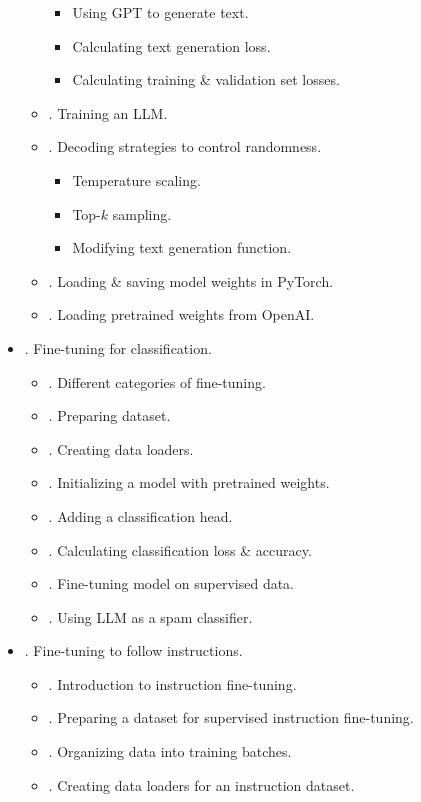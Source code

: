 \documentclass{article}
\begin{document}
\begin{itemize}
\begin{itemize}
		\begin{itemize}
			\item {\sf Using GPT to generate text.}
			\item {\sf Calculating text generation loss.}
			\item {\sf Calculating training \& validation set losses.}
		\end{itemize}
		\item {. Training an LLM.}
		\item {. Decoding strategies to control randomness.}
		\begin{itemize}
			\item {\sf Temperature scaling.}
			\item {\sf Top-$k$ sampling.}
			\item {\sf Modifying text generation function.}
		\end{itemize}
		\item {. Loading \& saving model weights in PyTorch.}
		\item {. Loading pretrained weights from OpenAI.}
	\end{itemize}
	\item {. Fine-tuning for classification.}
	\begin{itemize}
		\item {. Different categories of fine-tuning.}
		\item {. Preparing dataset.}
		\item {. Creating data loaders.}
		\item {. Initializing a model with pretrained weights.}
		\item {. Adding a classification head.}
		\item {. Calculating classification loss \& accuracy.}
		\item {. Fine-tuning model on supervised data.}
		\item {. Using LLM as a spam classifier.}
	\end{itemize}
	\item {. Fine-tuning to follow instructions.}
	\begin{itemize}
		\item {. Introduction to instruction fine-tuning.}
		\item {. Preparing a dataset for supervised instruction fine-tuning.}
		\item {. Organizing data into training batches.}
		\item {. Creating data loaders for an instruction dataset.}

\end{itemize}
\end{itemize}
\end{document}
